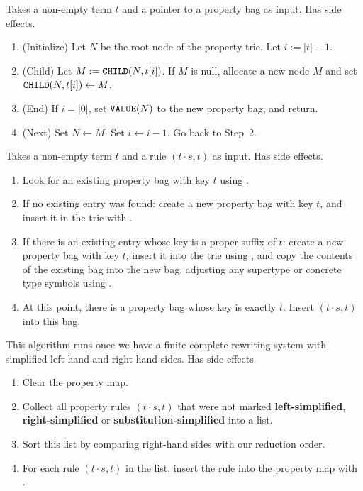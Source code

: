 \documentclass[../generics]{subfiles}
\begin{document}
\begin{algorithm}\label{alg:insert term suffix}
Takes a non-empty term $t$ and a pointer to a property bag as input. Has side effects.
\begin{enumerate}
\item (Initialize) Let $N$ be the root node of the property trie. Let $i:=|t|-1$.
\item (Child) Let $M:=\texttt{CHILD}(N,t[i])$. If $M$ is null, allocate a new node $M$ and set $\texttt{CHILD}(N,t[i])\leftarrow M$.
\item (End) If $i=|0|$, set $\texttt{VALUE}(N)$ to the new property bag, and return.
\item (Next) Set $N \leftarrow M$. Set $i \leftarrow i-1$. Go back to Step~2.
\end{enumerate}
\end{algorithm}

\begin{algorithm}\label{alg:insert property rule}
Takes a non-empty term $t$ and a rule $(t\cdot s, t)$ as input. Has side effects.
\begin{enumerate}
\item Look for an existing property bag with key $t$ using .
\item If no existing entry was found: create a new property bag with key $t$, and insert it in the trie with .
\item If there is an existing entry whose key is a proper suffix of $t$: create a new property bag with key $t$, insert it into the trie using , and copy the contents of the existing bag into the new bag, adjusting any supertype or concrete type symbols using .
\item At this point, there is a property bag whose key is exactly $t$. Insert $(t \cdot s, t)$ into this bag.
\end{enumerate}
\end{algorithm}

\begin{algorithm}\label{propmapconsalgo}
This algorithm runs once we have a finite complete rewriting system with simplified left-hand and right-hand sides. Has side effects.
\begin{enumerate}
\item Clear the property map.
\item Collect all property rules $(t \cdot s,t)$ that were not marked \textbf{left-simplified}, \textbf{right-simplified} or \textbf{substitution-simplified} into a list.
\item Sort this list by comparing right-hand sides with our reduction order.
\item For each rule $(t \cdot s, t)$ in the list, insert the rule into the property map with .
\end{enumerate}
\end{algorithm}
\end{document}
